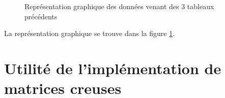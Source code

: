 \documentclass[a4paper]{scrartcl}
\begin{document}
\begin{figure}[H]
    \begin{center}
        \caption{Représentation graphique des données venant des 3 tableaux précédents}
        \label{fig:time}
    \end{center}
\end{figure}
La représentation graphique se trouve dans la figure \ref{fig:time}.

\section{Utilité de l'implémentation de matrices creuses}
\end{document}
